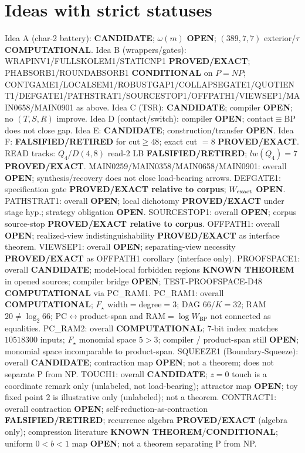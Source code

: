 \documentclass[11pt]{article}
\begin{document}
\section*{Ideas with strict statuses}
Idea A (char-2 battery): \textbf{CANDIDATE}; $\omega(m)$ \textbf{OPEN}; $(389,7,7)$ exterior/$\tau$ \textbf{COMPUTATIONAL}.
Idea B (wrappers/gates): WRAPINV1/FULLSKOLEM1/STATICNP1 \textbf{PROVED/EXACT};
PHABSORB1/ROUNDABSORB1 \textbf{CONDITIONAL} on $P=NP$;
CONTGAME1/LOCALSEM1/ROBUSTGAP1/COLLAPSEGATE1/QUOTIENT1/DEFGATE1/PATHSTRAT1/SOURCESTOP1/OFFPATH1/VIEWSEP1/MAIN0658/MAIN0901 as above.
Idea C (TSR): \textbf{CANDIDATE}; compiler \textbf{OPEN}; no $(T,S,R)$ improve.
Idea D (contact/switch): compiler \textbf{OPEN}; contact$\equiv$BP does not close gap.
Idea E: \textbf{CANDIDATE}; construction/transfer \textbf{OPEN}.
Idea F: \textbf{FALSIFIED/RETIRED} for cut$\ge48$; exact cut $=8$ \textbf{PROVED/EXACT}.
READ tracks: $Q_4$/$D(4,8)$ read-$2$ LB \textbf{FALSIFIED/RETIRED}; $lw(Q_4)=7$ \textbf{PROVED/EXACT}.
MAIN0259/MAIN0358/MAIN0658/MAIN0901: overall \textbf{OPEN}; synthesis/recovery does not close load-bearing arrows.
DEFGATE1: specification gate \textbf{PROVED/EXACT relative to corpus}; $W_{\rm exact}$ \textbf{OPEN}.
PATHSTRAT1: overall \textbf{OPEN}; local dichotomy \textbf{PROVED/EXACT} under stage hyp.; strategy obligation \textbf{OPEN}.
SOURCESTOP1: overall \textbf{OPEN}; corpus source-stop \textbf{PROVED/EXACT relative to corpus}.
OFFPATH1: overall \textbf{OPEN}; realized-view indistinguishability \textbf{PROVED/EXACT} as interface theorem.
VIEWSEP1: overall \textbf{OPEN}; separating-view necessity \textbf{PROVED/EXACT} as OFFPATH1 corollary (interface only).
PROOFSPACE1: overall \textbf{CANDIDATE}; model-local forbidden regions \textbf{KNOWN THEOREM} in opened sources;
compiler bridge \textbf{OPEN}; TEST-PROOFSPACE-D48 \textbf{COMPUTATIONAL} via PC\_RAM1.
PC\_RAM1: overall \textbf{COMPUTATIONAL}; $F_\star$ width$=$degree$=3$; DAG $66$/$K{=}32$; RAM $20\neq\log_2 66$;
PC$\leftrightarrow$product-span and RAM$=\log W_{\mathrm{BP}}$ not connected as equalities.
PC\_RAM2: overall \textbf{COMPUTATIONAL}; $7$-bit index matches $10518300$ inputs; $F_\star$ monomial space $5{>}3$;
compiler / product-span still \textbf{OPEN}; monomial space incomparable to product-span.
SQUEEZE1 (Boundary-Squeeze): overall \textbf{CANDIDATE}; contraction map \textbf{OPEN}; not a theorem;
does not separate P from NP.
TOUCH1: overall \textbf{CANDIDATE}; $z{=}0$ touch is a coordinate remark only (unlabeled, not load-bearing); attractor map \textbf{OPEN}; toy fixed point $2$ is illustrative only (unlabeled); not a theorem.
CONTRACT1: overall contraction \textbf{OPEN}; self-reduction-as-contraction \textbf{FALSIFIED/RETIRED};
recurrence algebra \textbf{PROVED/EXACT} (algebra only); compression literature \textbf{KNOWN THEOREM}/\textbf{CONDITIONAL};
uniform $0{<}b{<}1$ map \textbf{OPEN}; not a theorem separating P from NP.
\end{document}
